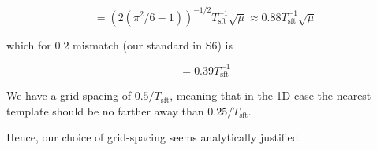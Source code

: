 \documentclass{article}
\begin{document}
\begin{equation}
[f-f0] = \left(2 (\pi^2/6 - 1)\right)^{-1/2} T_\mathrm{sft}^{-1} \sqrt{\mu}
       \approx 0.88  T_\mathrm{sft}^{-1} \sqrt{\mu}
\end{equation}

\noindent
which for $0.2$ mismatch (our standard in S6) is

\begin{equation}
[f-f0] = 0.39 T_\mathrm{sft}^{-1}
\end{equation}

We have a grid spacing of $0.5/T_\mathrm{sft}$, meaning that in the 1D case the
nearest template should be no farther away than $0.25/T_\mathrm{sft}$.

Hence, our choice of grid-spacing seems analytically justified.
\end{document}
